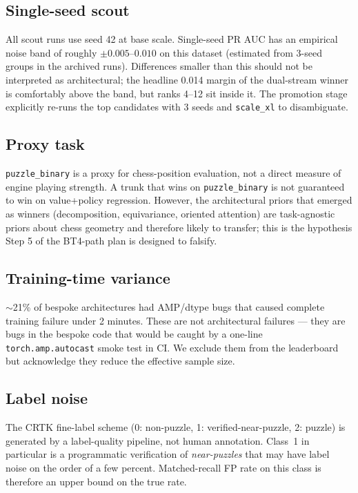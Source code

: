 \documentclass[10pt,a4paper]{article}
\begin{document}
\subsection*{Single-seed scout}
All scout runs use seed 42 at base scale. Single-seed PR AUC has an empirical
noise band of roughly $\pm 0.005$--$0.010$ on this dataset (estimated from
3-seed groups in the archived runs). Differences smaller than this should
not be interpreted as architectural; the headline 0.014 margin of the
dual-stream winner is comfortably above the band, but ranks 4--12 sit inside
it. The promotion stage explicitly re-runs the top candidates with 3 seeds
and \texttt{scale\_xl} to disambiguate.

\subsection*{Proxy task}
\texttt{puzzle\_binary} is a proxy for chess-position evaluation, not a
direct measure of engine playing strength. A trunk that wins on
\texttt{puzzle\_binary} is not guaranteed to win on value+policy regression.
However, the architectural priors that emerged as winners
(decomposition, equivariance, oriented attention) are task-agnostic priors
about chess geometry and therefore likely to transfer; this is the
hypothesis Step 5 of the BT4-path plan is designed to falsify.

\subsection*{Training-time variance}
$\sim$21\% of bespoke architectures had AMP/dtype bugs that caused complete
training failure under 2 minutes. These are not architectural failures ---
they are bugs in the bespoke code that would be caught by a one-line
\texttt{torch.amp.autocast} smoke test in CI. We exclude them from the
leaderboard but acknowledge they reduce the effective sample size.

\subsection*{Label noise}
The CRTK fine-label scheme (0: non-puzzle, 1: verified-near-puzzle,
2: puzzle) is generated by a label-quality pipeline, not human annotation.
Class~1 in particular is a programmatic verification of \emph{near-puzzles}
that may have label noise on the order of a few percent. Matched-recall FP
rate on this class is therefore an upper bound on the true rate.
\end{document}
